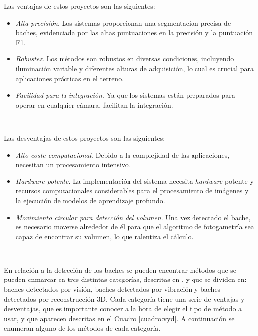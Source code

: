 Las ventajas de estos proyectos son las siguientes:

\begin{itemize}
	\item \textit{Alta precisión}. Los sistemas proporcionan una segmentación precisa de baches, evidenciada por las altas puntuaciones en la precisión y la puntuación F1.
	\item \textit{Robustez}. Los métodos son robustos en diversas condiciones, incluyendo iluminación variable y diferentes alturas de adquisición, lo cual es crucial para aplicaciones prácticas en el terreno.
	\item \textit{Facilidad para la integración}. Ya que los sistemas están preparados para operar en cualquier cámara, facilitan la integración.
	
\end{itemize}\


Las desventajas de estos proyectos son las siguientes:
\begin{itemize}
	\item \textit{Alto coste computacional}. Debido a la complejidad de las aplicaciones, necesitan un procesamiento intensivo. 
	\item \textit{Hardware potente}. La implementación del sistema necesita \textit{hardware} potente y recursos computacionales considerables para el procesamiento de imágenes y la ejecución de modelos de aprendizaje profundo.
	\item \textit{Movimiento circular para detección del volumen}. Una vez detectado el bache, es necesario moverse alrededor de él para que el algoritmo de fotogametría sea capaz de encontrar su volumen, lo que ralentiza el cálculo.
	
\end{itemize}\


En relación a la detección de los baches se pueden encontrar métodos que se pueden enmarcar en tres distintas categorías, descritas en \cite{app12115320}, y que se dividen en: baches detectados por visión, baches detectados por vibración y baches detectados por reconstrucción 3D. Cada categoría tiene una serie de ventajas y desventajas, que es importante conocer a la hora de elegir el tipo de método a usar, y que aparecen descritas en el Cuadro \ref{cuadro:vyd}. A continuación se enumeran alguno de los métodos de cada categoría.

